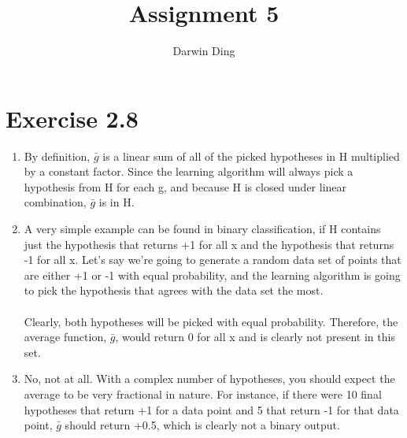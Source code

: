 \documentclass[12pt]{article}
\begin{document}
\title{Assignment 5}
\author{Darwin Ding}
\maketitle

\section*{Exercise 2.8}
\begin{enumerate}[label=(\alph*)]
	\item By definition, $\bar{g}$ is a linear sum of all of the picked hypotheses in H multiplied by a constant factor. Since the learning algorithm will always pick a hypothesis from H for each g, and because H is closed under linear combination, $\bar{g}$ is in H.
	\item A very simple example can be found in binary classification, if H contains just the hypothesis that returns +1 for all x and the hypothesis that returns -1 for all x. Let's say we're going to generate a random data set of points that are either +1 or -1 with equal probability, and the learning algorithm is going to pick the hypothesis that agrees with the data set the most.
	\\ \\ Clearly, both hypotheses will be picked with equal probability. Therefore, the average function, $\bar{g}$, would return 0 for all x and is clearly not present in this set.
	\item No, not at all. With a complex number of hypotheses, you should expect the average to be very fractional in nature. For instance, if there were 10 final hypotheses that return +1 for a data point and 5 that return -1 for that data point, $\bar{g}$ should return +0.5, which is clearly not a binary output.
\end{enumerate}
\end{document}
